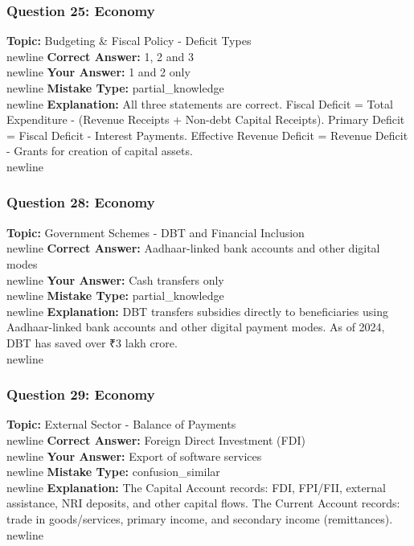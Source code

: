\documentclass[a4paper,12pt]{article}
\begin{document}
\subsubsection{Question 25: Economy}
\textbf{Topic:} Budgeting \& Fiscal Policy - Deficit Types\\newline
\textbf{Correct Answer:} 1, 2 and 3\\newline
\textbf{Your Answer:} \textcolor{wrongred}{1 and 2 only}\\newline
\textbf{Mistake Type:} partial\_knowledge\\newline
\textbf{Explanation:} All three statements are correct. Fiscal Deficit = Total Expenditure - (Revenue Receipts + Non-debt Capital Receipts). Primary Deficit = Fiscal Deficit - Interest Payments. Effective Revenue Deficit = Revenue Deficit - Grants for creation of capital assets.\\newline
\vspace{0.5cm}
\subsubsection{Question 28: Economy}
\textbf{Topic:} Government Schemes - DBT and Financial Inclusion\\newline
\textbf{Correct Answer:} Aadhaar-linked bank accounts and other digital modes\\newline
\textbf{Your Answer:} \textcolor{wrongred}{Cash transfers only}\\newline
\textbf{Mistake Type:} partial\_knowledge\\newline
\textbf{Explanation:} DBT transfers subsidies directly to beneficiaries using Aadhaar-linked bank accounts and other digital payment modes. As of 2024, DBT has saved over ₹3 lakh crore.\\newline
\vspace{0.5cm}
\subsubsection{Question 29: Economy}
\textbf{Topic:} External Sector - Balance of Payments\\newline
\textbf{Correct Answer:} Foreign Direct Investment (FDI)\\newline
\textbf{Your Answer:} \textcolor{wrongred}{Export of software services}\\newline
\textbf{Mistake Type:} confusion\_similar\\newline
\textbf{Explanation:} The Capital Account records: FDI, FPI/FII, external assistance, NRI deposits, and other capital flows. The Current Account records: trade in goods/services, primary income, and secondary income (remittances).\\newline
\vspace{0.5cm}
\end{document}
